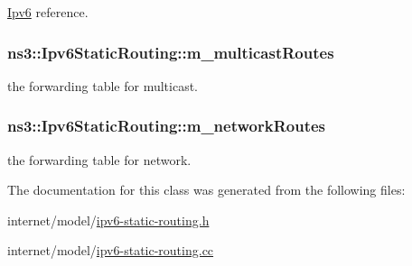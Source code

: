 \hyperlink{classns3_1_1Ipv6}{Ipv6} reference. 

\subsubsection[{\texorpdfstring{m\+\_\+multicast\+Routes}{m_multicastRoutes}}]{ ns3\+::\+Ipv6\+Static\+Routing\+::m\+\_\+multicast\+Routes\hspace{0.3cm}{\ttfamily [private]}}\hypertarget{classns3_1_1Ipv6StaticRouting_ab9690b202d45d5567be46567a4f782ac}{}\label{classns3_1_1Ipv6StaticRouting_ab9690b202d45d5567be46567a4f782ac}


the forwarding table for multicast. 

\subsubsection[{\texorpdfstring{m\+\_\+network\+Routes}{m_networkRoutes}}]{ ns3\+::\+Ipv6\+Static\+Routing\+::m\+\_\+network\+Routes\hspace{0.3cm}{\ttfamily [private]}}\hypertarget{classns3_1_1Ipv6StaticRouting_ac6d146555b173ef5ca8028ab981f8ab6}{}\label{classns3_1_1Ipv6StaticRouting_ac6d146555b173ef5ca8028ab981f8ab6}


the forwarding table for network. 



The documentation for this class was generated from the following files\+:\begin{DoxyCompactItemize}
\item 
internet/model/\hyperlink{ipv6-static-routing_8h}{ipv6-\/static-\/routing.\+h}\item 
internet/model/\hyperlink{ipv6-static-routing_8cc}{ipv6-\/static-\/routing.\+cc}\end{DoxyCompactItemize}
